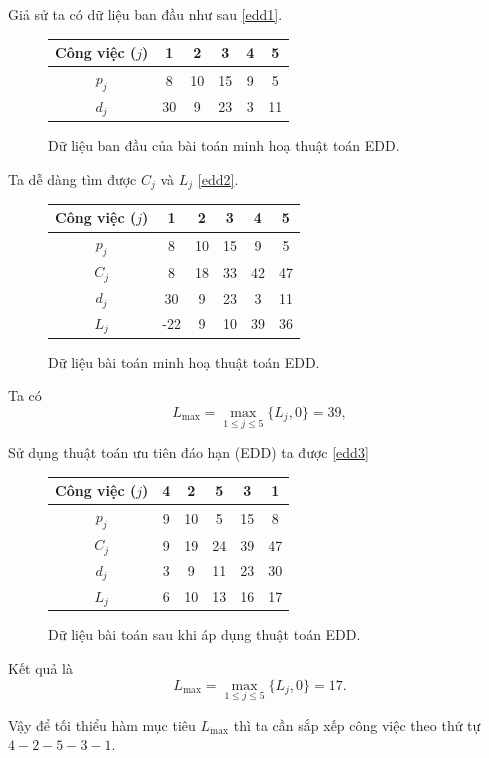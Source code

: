 \begin{vd}
Giả sử ta có dữ liệu ban đầu như sau \eqref{edd1}.
\begin{figure}[h!]
\centering
	\begin{tabular}{|c | c c c c c |} 
	\hline
	Công việc ($j$) & 1 & 2 & 3 & 4 & 5 \\
	\hline\hline
	$p_j$ & 8 & 10 & 15 & 9 & 5 \\
	$d_j$ & 30 & 9 & 23 & 3 & 11 \\
	\hline
	\end{tabular}
	\caption{\label{edd1} Dữ liệu ban đầu của bài toán minh hoạ thuật toán EDD.}
\end{figure}

Ta dễ dàng tìm được $C_j$ và $L_j$ \eqref{edd2}.
\begin{figure}[h!]
\centering
	\begin{tabular}{|c | c c c c c |} 
	\hline
	Công việc ($j$) & 1 & 2 & 3 & 4 & 5 \\
	\hline\hline
	$p_j$ & 8 & 10 & 15 & 9 & 5 \\
	$C_j$ & 8 & 18 & 33 & 42 & 47 \\
	$d_j$ & 30 & 9 & 23 & 3 & 11 \\
	$L_j$ & -22 & 9 & 10 & 39 & 36 \\
	\hline
	\end{tabular}
	\caption{\label{edd2} Dữ liệu bài toán minh hoạ thuật toán EDD.}
\end{figure}

Ta có
\begin{equation*}
	L_{\max} = \max _{1 \leq j \leq 5} \{L_j, 0\} = 39,
\end{equation*}

Sử dụng thuật toán ưu tiên đáo hạn (EDD) ta được \eqref{edd3}

\begin{figure}[h!]
\centering
	\begin{tabular}{|c | c c c c c |} 
	\hline
	Công việc ($j$) & 4 & 2 & 5 & 3 & 1 \\
	\hline\hline
	$p_j$ & 9 & 10 & 5 & 15 & 8 \\
	$C_j$ & 9 & 19 & 24 & 39 & 47 \\
	$d_j$ & 3 & 9 & 11 & 23 & 30 \\
	$L_j$ & 6 & 10 & 13 & 16 & 17 \\
	\hline
	\end{tabular}
	\caption{\label{edd3} Dữ liệu bài toán sau khi áp dụng thuật toán EDD.}
\end{figure}

Kết quả là
\begin{equation*}
	L_{\max} = \max _{1 \leq j \leq 5} \{L_j, 0\} = 17.
\end{equation*}

Vậy để tối thiểu hàm mục tiêu $L_{\max}$ thì ta cần sắp xếp công việc theo thứ tự $4-2-5-3-1$.
\end{vd}

